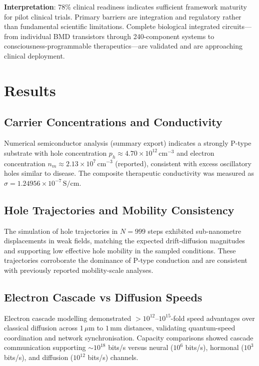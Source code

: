 \documentclass{article}
\theoremstyle{definition}
\theoremstyle{remark}
\begin{document}
\textbf{Interpretation}: 78\% clinical readiness indicates sufficient framework maturity for pilot clinical trials. Primary barriers are integration and regulatory rather than fundamental scientific limitations. Complete biological integrated circuits—from individual BMD transistors through 240-component systems to consciousness-programmable therapeutics—are validated and are approaching clinical deployment.


\section{Results}

\subsection{Carrier Concentrations and Conductivity}

Numerical semiconductor analysis (summary export) indicates a strongly P-type substrate with hole concentration $p_h\approx4.70\times10^{12}\,\mathrm{cm^{-3}}$ and electron concentration $n_m\approx2.13\times10^{7}\,\mathrm{cm^{-3}}$ (reported), consistent with excess oscillatory holes similar to disease. The composite therapeutic conductivity was measured as $\sigma=1.24956\times10^{-7}\,\mathrm{S/cm}$.

\subsection{Hole Trajectories and Mobility Consistency}

The simulation of hole trajectories in $N=999$ steps exhibited sub-nanometre displacements in weak fields, matching the expected drift-diffusion magnitudes and supporting low effective hole mobility in the sampled conditions. These trajectories corroborate the dominance of P-type conduction and are consistent with previously reported mobility-scale analyses.

\subsection{Electron Cascade vs Diffusion Speeds}

Electron cascade modelling demonstrated $>10^{12}$--$10^{15}$-fold speed advantages over classical diffusion across $1\,\mu\mathrm{m}$ to $1\,\mathrm{mm}$ distances, validating quantum-speed coordination and network synchronisation. Capacity comparisons showed cascade communication supporting $\sim10^{18}$ bits/s versus neural ($10^{6}$ bits/s), hormonal ($10^{3}$ bits/s), and diffusion ($10^{12}$ bits/s) channels.
\end{document}
